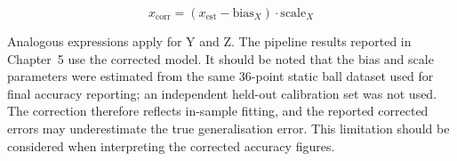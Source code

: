 \begin{equation}
x_{\text{corr}} = (x_{\text{est}} - \text{bias}_X) \cdot \text{scale}_X
\label{eqn:4_5_x_correction}
\end{equation}

Analogous expressions apply for Y and Z. The pipeline results reported in Chapter~5 use the corrected model. It should be noted that the bias and scale parameters were estimated from the same 36-point static ball dataset used for final accuracy reporting; an independent held-out calibration set was not used. The correction therefore reflects in-sample fitting, and the reported corrected errors may underestimate the true generalisation error. This limitation should be considered when interpreting the corrected accuracy figures.
